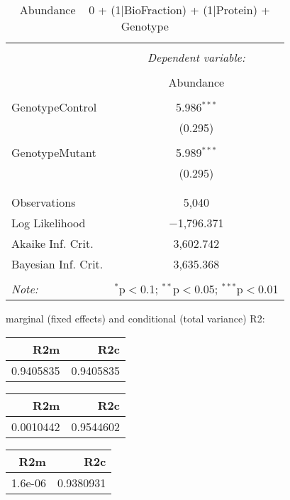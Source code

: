 \documentclass[11pt]{report}
\begin{document}
\begin{table}[!htbp] \centering 
  \caption{Abundance ~ 0 + (1|BioFraction) + (1|Protein) + Genotype} 
  \label{} 
\begin{tabular}{@{\extracolsep{5pt}}lc} 
\\[-1.8ex]\hline 
\hline \\[-1.8ex] 
 & \multicolumn{1}{c}{\textit{Dependent variable:}} \\ 
\cline{2-2} 
\\[-1.8ex] & Abundance \\ 
\hline \\[-1.8ex] 
 GenotypeControl & 5.986$^{***}$ \\ 
  & (0.295) \\ 
  & \\ 
 GenotypeMutant & 5.989$^{***}$ \\ 
  & (0.295) \\ 
  & \\ 
\hline \\[-1.8ex] 
Observations & 5,040 \\ 
Log Likelihood & $-$1,796.371 \\ 
Akaike Inf. Crit. & 3,602.742 \\ 
Bayesian Inf. Crit. & 3,635.368 \\ 
\hline 
\hline \\[-1.8ex] 
\textit{Note:}  & \multicolumn{1}{r}{$^{*}$p$<$0.1; $^{**}$p$<$0.05; $^{***}$p$<$0.01} \\ 
\end{tabular} 
\end{table} 
marginal (fixed effects) and conditional (total variance) R2:

\begin{tabular}{r|r}
\hline
R2m & R2c\\
\hline
0.9405835 & 0.9405835\\
\hline
\end{tabular}

\begin{tabular}{r|r}
\hline
R2m & R2c\\
\hline
0.0010442 & 0.9544602\\
\hline
\end{tabular}

\begin{tabular}{r|r}
\hline
R2m & R2c\\
\hline
1.6e-06 & 0.9380931\\
\hline
\end{tabular}
\end{document}
